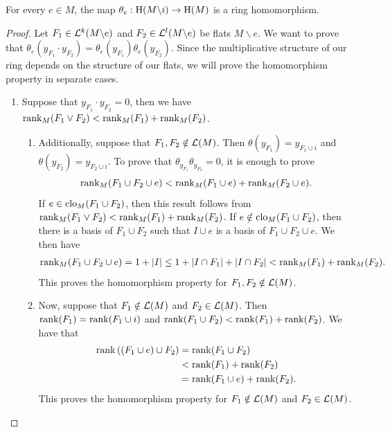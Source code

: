 \documentclass{puthesis-UG}
\begin{document}
\begin{lem}\label{lem:theta-is-a-ring-homomorphism}
	For every $e \in M$, the map $\theta_e : \operatorname{H}(M \backslash i) \to \operatorname{H}(M)$ is a ring homomorphism. 
\end{lem}

\begin{proof}
	Let $F_1 \in \mathcal{L}^k(M \backslash e)$ and $F_2 \in \mathcal{L}^l(M \backslash e)$ be flats $M \backslash e$. We want to prove that $\theta_e (y_{F_1} \cdot y_{F_2}) = \theta_e(y_{F_1}) \theta_e(y_{F_2})$. Since the multiplicative structure of our ring depends on the structure of our flats, we will prove the homomorphism property in separate cases. 
	\begin{enumerate}[label = (\alph*)]
		\item Suppose that $y_{F_1} \cdot y_{F_2} = 0$, then we have $\operatorname{rank}_M(F_1 \vee F_2) < \operatorname{rank}_M(F_1) + \operatorname{rank}_M(F_2)$.
		\begin{enumerate}[label = (\roman*)]
			\item Additionally, suppose that $F_1, F_2 \notin \mathcal{L}(M)$. Then $\theta (y_{F_1}) = y_{F_1 \cup i}$ and $\theta(y_{F_2}) = y_{F_2 \cup i}$. To prove that $\theta_{y_{F_1}} \theta_{y_{F_2}} = 0$, it is enough to prove 
			\[
				\operatorname{rank}_M(F_1 \cup F_2 \cup e) < \operatorname{rank}_M(F_1 \cup e) + \operatorname{rank}_M(F_2 \cup e).
			\]
			If $e \in \operatorname{clo}_M(F_1 \cup F_2)$, then this result follows from $\operatorname{rank}_M(F_1 \vee F_2) < \operatorname{rank}_M(F_1) + \operatorname{rank}_M(F_2)$. If $e \notin \operatorname{clo}_M(F_1 \cup F_2)$, then there is a basis of $F_1 \cup F_2$ such that $I \cup e$ is a basis of $F_1 \cup F_2 \cup e$. We then have 
			\begin{align*}
				\operatorname{rank}_M(F_1 \cup F_2 \cup e) = 1 + |I| \leq 1 + |I \cap F_1| + |I \cap F_2| < \operatorname{rank}_M(F_1) + \operatorname{rank}_M(F_2).
			\end{align*}
			This proves the homomorphism property for $F_1, F_2 \notin \mathcal{L}(M)$.

			\item Now, suppose that $F_1 \notin \mathcal{L}(M)$ and $F_2 \in \mathcal{L}(M)$. Then $\operatorname{rank} (F_1) = \operatorname{rank} (F_1 \cup i)$ and $\operatorname{rank} (F_1 \cup F_2) < \operatorname{rank} (F_1) + \operatorname{rank} (F_2)$. We have that 
			\begin{align*}
				\operatorname{rank} \left((F_1 \cup e) \cup F_2\right) & = \operatorname{rank} (F_1 \cup F_2) \\
				& < \operatorname{rank} (F_1) + \operatorname{rank} (F_2) \\
				& = \operatorname{rank} (F_1 \cup e) + \operatorname{rank} (F_2). 
			\end{align*}
			This proves the homomorphism property for $F_1 \notin \mathcal{L}(M)$ and $F_2 \in \mathcal{L}(M)$. 


\end{enumerate}
\end{enumerate}
\end{proof}
\end{document}
